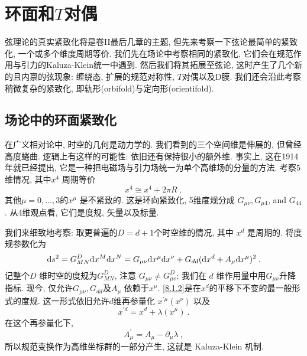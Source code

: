 
\chapter{环面和$T$对偶} \label{cha:8}
弦理论的真实紧致化将是卷II最后几章的主题, 但先来考察一下弦论最简单的紧致化, 一个或多个维度周期等价. 
我们先在场论中考察相同的紧致化, 它们会在规范作用与引力的Kaluza-Klein统一中遇到. 然后我们将其拓展至弦论, 这时产生了几个新的且内禀的弦现象: 
缠绕态, 扩展的规范对称性, $T$对偶以及D膜. 我们还会沿此考察稍微复杂的紧致化, 即轨形(orbifold)与定向形(orientifold).

\section{场论中的环面紧致化} \label{sec:8.1}

在广义相对论中, 时空的几何是动力学的. 我们看到的三个空间维是伸展的, 但曾经高度蜷曲. 逻辑上有这样的可能性: 依旧还有保持很小的额外维. 
事实上, 这在1914年就已经提出, 它是一种把电磁场与引力场统一为单个高维场的分量的方法. 考察5维情况, 其中$x^{4}$ 周期等价
\begin{equation}
	x^{4} \cong x^{4}+2 \pi R \:, \label{8.1.1}
\end{equation}
其他$\mu=0,\ldots,3$的$x^{\mu}$ 是不紧致的. 这是环向紧致化, 5维度规分成 $G_{\mu \nu}, G_{\mu 4}$, and $G_{44} $. 从4维观点看, 它们是度规, 矢量以及标量.


我们来细致地考察: 取更普遍的$D=d+1$个时空维的情况, 其中 $x^{d}$ 是周期的. 将度规参数化为
\begin{equation}
	\mathrm{d} s^{2}=G_{M N}^{D} \mathrm{d} x^{M} \mathrm{d} x^{N}=G_{\mu \nu} \mathrm{d} x^{\mu} \mathrm{d} x^{\nu}+G_{d d}(\mathrm{d} x^{d}+A_{\mu} \mathrm{d} x^{\mu})^{2} \:.
	\label{8.1.2}
\end{equation}
记整个$D$ 维时空的度规为$G_{M N}^{D} $, 注意 $G_{\mu \nu} \neq G_{\mu v}^{D} $; 我们在 $d$ 维作用量中用$G_{\mu \nu} $升降指标. 
现今, 仅允许$G_{\mu \nu}, G_{d d}$及$A_{\mu}$ 依赖于$x^{\mu}$.  \eqref{8.1.2}是在$x^{d}$的平移下不变的最一般形式的度规. 
这一形式依旧允许$d$维再参量化 $x^{\prime \mu}(x^{\nu})$ 以及
\begin{equation}
	x^{\prime d}=x^{d}+\lambda(x^{\mu}) \:. \label{8.1.3}
\end{equation}
在这个再参量化下,
\begin{equation}
	A_{\mu}^{\prime}=A_{\mu}-\partial_{\mu} \lambda \:, \label{8.1.4}
\end{equation}
所以规范变换作为高维坐标群的一部分产生, 这就是 Kaluza-Klein 机制.

